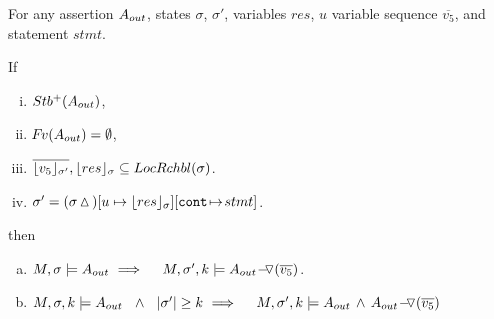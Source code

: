 \begin{lemma}
\label{l:calls:return:ext}

For any  assertion $\Aout$, states $\sigma$, $\sigma'$, variables $res$, $u$ variable sequence   $\overline{v_5}$,  and statement $stmt$.

\noindent
 If 
 
\begin{enumerate}[(i)]
\item 
$ \Pos \Aout$,  
\item 
 $\fv(\Aout) = \emptyset$,
\item
$  \overline {\interpret {\sigma'} {v_5}}, {\interpret {\sigma} {res}} \subseteq \LRelevantO \sigma $.
 \item
$\sigma'= (\sigma \popSymbol)[ u  \mapsto  {\interpret {\sigma} {res}}][\prg{cont}\!\mapsto\! stmt]$.
  \end{enumerate}
 \noindent
then

\begin{enumerate}[a.]
\item
 \label{l:ext:return:one}
 $M, \sigma \models  {\Aout}\  
 \hfill \Longrightarrow  \ \ \  \  \satDAssertFrom M  {\sigma'} k  {\PushASLong  {(\overline {v_5})}    {\Aout}}$.

\item
\label{l:ext:return:two}
$\satDAssertFrom M  \sigma k   \Aout  \ \  \wedge\ \ \DepthSt {\sigma'} \geq k  \ 
 \hfill \Longrightarrow  \ \ \  \   \satDAssertFrom M  {\sigma'} k   {\Aout \, \wedge\, {\PushASLong  {(\overline {v_5})}    {\Aout}}} $

 
\end{enumerate}

\end{lemma}

